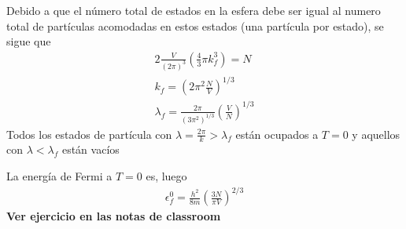 \documentclass{article}
\begin{document}
Debido a que el número total de estados en la esfera debe ser igual al numero total de partículas acomodadas en estos estados (una partícula por estado), se sigue que 
\begin{gather*}
  2 \frac{V }{(2\pi)^3 }\left(\frac{4}{3}\pi k_f^3 \right) = N \\
  k_f = (2 \pi^2 \frac{N}{V })^{1/3}\\
  \lambda_f = \frac{2\pi }{(3\pi^2)^{1/3} }\left(\frac{V }{N }\right)^ {1/3 }
\end{gather*}
Todos los estados de partícula con $ \lambda = \frac{2\pi }{k } >\lambda_f  $ están ocupados a $ T = 0  $ y aquellos con $ \lambda< \lambda_f  $ están vacíos 

La energía de Fermi a $ T = 0  $ es, luego 
\begin{gather*}
  \epsilon_f ^0 = \frac{h^2 }{8m } \left(\frac{3N }{\pi V }\right)^ {2/3 } 
\end{gather*}
\textbf{Ver ejercicio en las notas de classroom}
\end{document}
